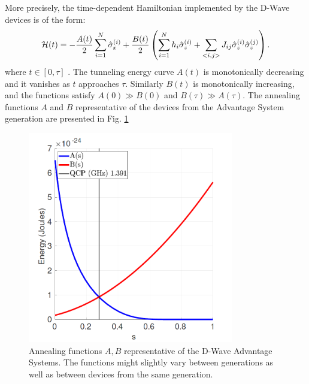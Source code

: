 More precisely, the time-dependent Hamiltonian implemented by the D-Wave
devices is of the form:
\begin{equation}
  \label{eq:dwaveham}
  \mathcal{H}(t) =  -\frac{A(t)}{2}\sum_{i=1}^N \hat{\sigma}^{(i)}_x + \frac{B(t)}{2}\left(\sum_{i=1}^N h_i \hat{\sigma}^{(i)}_z + \sum_{<i, j>} J_{ij} \hat{\sigma}^{(i)}_z \hat{\sigma}^{(j)}_z\right).
\end{equation}
where $t \in [0, \tau]$ \cite{dwavedocs}. The tunneling energy curve $A(t)$ is
monotonically decreasing and it vanishes as $t$ approaches $\tau$. Similarly
$B(t)$ is monotonically increasing, and the functions satisfy $A(0) \gg B(0)$
and $B(\tau) \gg A(\tau)$. The annealing functions $A$ and $B$ representative of
the devices from the Advantage System generation are presented in Fig. \ref{fig:annealingfuncs}

\begin{figure}
  \centering
  \includegraphics[width=0.8\textwidth]{figures/annealing-functions.png}
  \caption{Annealing functions $A,B$ representative of the D-Wave Advantage Systems.
    The functions might slightly vary between generations as well as between devices
    from the same generation.
  }
  \label{fig:annealingfuncs}
\end{figure}



